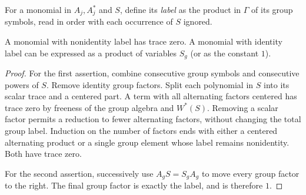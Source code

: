 For a monomial in $A_j,A_j^*$ and $S$, define its \emph{label} as the product in $\Gamma$ of its group symbols, read in order with each occurrence of $S$ ignored.
\begin{lemma}\label{lem:labels}
A monomial with nonidentity label has trace zero. A monomial with identity label can be expressed as a product of variables $S_g$ (or as the constant $1$).
\end{lemma}
\begin{proof}
For the first assertion, combine consecutive group symbols and consecutive powers of $S$. Remove identity group factors. Split each polynomial in $S$ into its scalar trace and a centered part. A term with all alternating factors centered has trace zero by freeness of the group algebra and $W^*(S)$. Removing a scalar factor permits a reduction to fewer alternating factors, without changing the total group label. Induction on the number of factors ends with either a centered alternating product or a single group element whose label remains nonidentity. Both have trace zero.

For the second assertion, successively use $A_g S=S_g A_g$ to move every group factor to the right. The final group factor is exactly the label, and is therefore $1$.
\end{proof}

